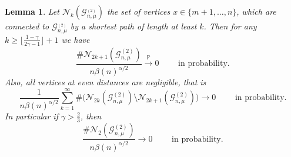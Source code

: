 \documentclass[12pt,a4paper]{article}
\numberwithin{equation}{section}
\newtheorem{lemma}[shared]{Lemma}
\begin{document}
\begin{lemma}\label{pathlength}
Let
$\mathcal{N}_k(\mathcal G_{n,\mu}^{_{(2)}})$ the set of vertices $x\in\{m+1,\ldots,n\}$, which are connected to $\mathcal G_{n,\mu}^{_{(2)}}$ by a shortest path of length at least $k$.  Then for any $k\ge\big\lfloor\tfrac{1-\gamma}{2\gamma-1}\big\rfloor +1  $ we have 
$$\frac{\#\mathcal{N}_{2k+1}(\mathcal G_{n,\mu}^{(2)})}{n\beta(n)^{\alpha/2}}\overset{\mathbb P}{\longrightarrow }0\qquad \text{ in probability.}$$
Also, all vertices at even distances are negligible, that is
$$\frac{1}{n\beta(n)^{\alpha/2}}\sum_{k=1}^\infty \#\big(\mathcal{N}_{2k}(\mathcal G_{n,\mu}^{(2)})\setminus \mathcal{N}_{2k+1}(\mathcal G_{n,\mu}^{(2)})\big)
\longrightarrow 0\qquad \text{ in probability.}$$
In particular if $\gamma>\tfrac23$, then
$$\frac{\#\mathcal{N}_2(\mathcal G_{n,\mu}^{(2)})}{n\beta(n)^{\alpha/2}}\longrightarrow 0\qquad \text{ in probability.}$$
    
\end{lemma}
\end{document}
